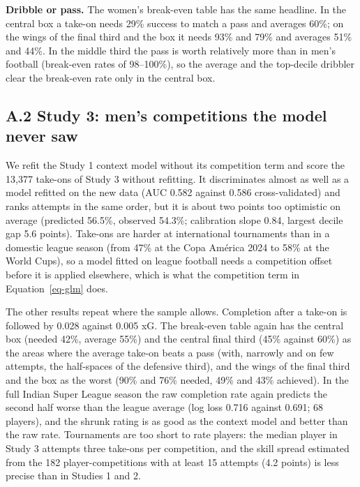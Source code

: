 \documentclass[
  12pt]{article}
\begin{document}
\textbf{Dribble or pass.} The women's break-even table has the same
headline. In the central box a take-on needs 29\% success to match a
pass and averages 60\%; on the wings of the final third and the box it
needs 93\% and 79\% and averages 51\% and 44\%. In the middle third the
pass is worth relatively more than in men's football (break-even rates
of 98--100\%), so the average and the top-decile dribbler clear the
break-even rate only in the central box.

\subsection*{A.2 Study 3: men's competitions the model never
saw}\label{sec-transfer}

We refit the Study 1 context model without its competition term and
score the 13,377 take-ons of Study 3 without refitting. It discriminates
almost as well as a model refitted on the new data (AUC 0.582 against
0.586 cross-validated) and ranks attempts in the same order, but it is
about two points too optimistic on average (predicted 56.5\%, observed
54.3\%; calibration slope 0.84, largest decile gap 5.6 points). Take-ons
are harder at international tournaments than in a domestic league season
(from 47\% at the Copa América 2024 to 58\% at the World Cups), so a
model fitted on league football needs a competition offset before it is
applied elsewhere, which is what the competition term in
Equation~\ref{eq-glm} does.

The other results repeat where the sample allows. Completion after a
take-on is followed by 0.028 against 0.005 xG. The break-even table
again has the central box (needed 42\%, average 55\%) and the central
final third (45\% against 60\%) as the areas where the average take-on
beats a pass (with, narrowly and on few attempts, the half-spaces of the
defensive third), and the wings of the final third and the box as the
worst (90\% and 76\% needed, 49\% and 43\% achieved). In the full Indian
Super League season the raw completion rate again predicts the second
half worse than the league average (log loss 0.716 against 0.691; 68
players), and the shrunk rating is as good as the context model and
better than the raw rate. Tournaments are too short to rate players: the
median player in Study 3 attempts three take-ons per competition, and
the skill spread estimated from the 182 player-competitions with at
least 15 attempts (4.2 points) is less precise than in Studies 1 and 2.
\end{document}
